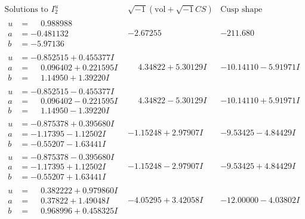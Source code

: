 \documentclass[1p]{elsarticle_modified}
\theoremstyle{definition}
\newcommand{\I}{\sqrt{-1}}
\begin{document}
$$\begin{array}{c|c|c}  
\text{Solutions to }I^u_{2}& \I (\text{vol} + \sqrt{-1}CS) & \text{Cusp shape}\\
 \hline 
\begin{aligned}
u &= \phantom{-}0.988988\phantom{ +0.000000I} \\
a &= -0.481132\phantom{ +0.000000I} \\
b &= -5.97136\phantom{ +0.000000I}\end{aligned}
 & -2.67255\phantom{ +0.000000I} & -211.680\phantom{ +0.000000I} \\ \hline\begin{aligned}
u &= -0.852515 + 0.455377 I \\
a &= \phantom{-}0.096402 + 0.221595 I \\
b &= \phantom{-}1.14950 + 1.39220 I\end{aligned}
 & \phantom{-}4.34822 + 5.30129 I & -10.14110 - 5.91971 I \\ \hline\begin{aligned}
u &= -0.852515 - 0.455377 I \\
a &= \phantom{-}0.096402 - 0.221595 I \\
b &= \phantom{-}1.14950 - 1.39220 I\end{aligned}
 & \phantom{-}4.34822 - 5.30129 I & -10.14110 + 5.91971 I \\ \hline\begin{aligned}
u &= -0.875378 + 0.395680 I \\
a &= -1.17395 - 1.12502 I \\
b &= -0.55207 - 1.63441 I\end{aligned}
 & -1.15248 + 2.97907 I & -9.53425 - 4.84429 I \\ \hline\begin{aligned}
u &= -0.875378 - 0.395680 I \\
a &= -1.17395 + 1.12502 I \\
b &= -0.55207 + 1.63441 I\end{aligned}
 & -1.15248 - 2.97907 I & -9.53425 + 4.84429 I \\ \hline\begin{aligned}
u &= \phantom{-}0.382222 + 0.979860 I \\
a &= \phantom{-}0.37822 + 1.49048 I \\
b &= \phantom{-}0.968996 + 0.458325 I\end{aligned}
 & -4.05295 + 3.42058 I & -12.00000 - 4.03802 I \\ \hline\begin{aligned}

\end{aligned}
\end{array}$$
\end{document}
